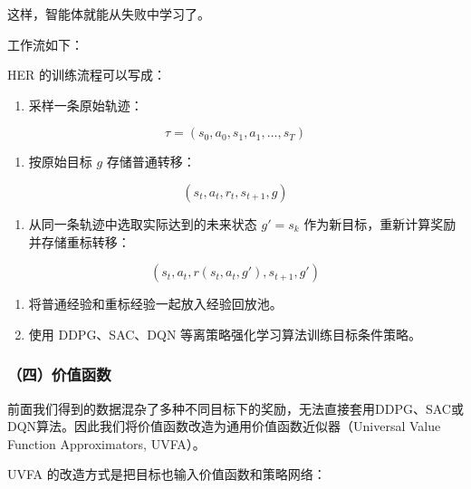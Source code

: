 这样，智能体就能从失败中学习了。

工作流如下：

HER 的训练流程可以写成：

\begin{enumerate}
\def\labelenumi{\arabic{enumi}.}
\tightlist
\item
{}
  采样一条原始轨迹：
\end{enumerate}

\[
\tau=(s_0,a_0,s_1,a_1,\ldots,s_T)
\]

\begin{enumerate}
\def\labelenumi{\arabic{enumi}.}
\setcounter{enumi}{1}
\tightlist
\item
{}
  按原始目标 \(g\) 存储普通转移：
\end{enumerate}

\[
(s_t,a_t,r_t,s_{t+1},g)
\]

\begin{enumerate}
\def\labelenumi{\arabic{enumi}.}
\setcounter{enumi}{2}
\tightlist
\item
{}
  从同一条轨迹中选取实际达到的未来状态 \(g'=s_k\) 作为新目标，重新计算奖励并存储重标转移：
\end{enumerate}

\[
(s_t,a_t,r(s_t,a_t,g'),s_{t+1},g')
\]

\begin{enumerate}
\def\labelenumi{\arabic{enumi}.}
\setcounter{enumi}{3}
\tightlist
\item
  将普通经验和重标经验一起放入经验回放池。
\item
  使用 DDPG、SAC、DQN 等离策略强化学习算法训练目标条件策略。
\end{enumerate}

\hypertarget{ux56dbux4ef7ux503cux51fdux6570}{%
\subsubsection{（四）价值函数}\label{ux56dbux4ef7ux503cux51fdux6570}}

前面我们得到的数据混杂了多种不同目标下的奖励，无法直接套用DDPG、SAC或DQN算法。因此我们将价值函数改造为通用价值函数近似器（Universal Value Function Approximators, UVFA）。

UVFA 的改造方式是把目标也输入价值函数和策略网络：

